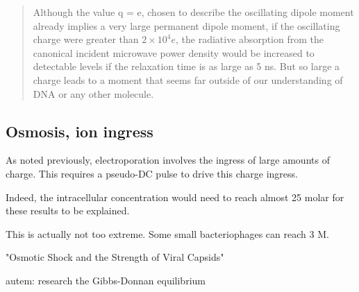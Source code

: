 \documentclass[paper.tex]{subfiles}
\begin{document}
\cite{Vibrational2002}
\begin{quote}
	Although the value q = e, chosen to describe the oscillating dipole moment already implies a very large permanent dipole moment, if the oscillating charge were greater
	than $2\times 10^4 e$, the radiative absorption from the canonical
	incident microwave power density would be increased to
	detectable levels if the relaxation time is as large as 5 ns.
	But so large a charge leads to a moment that seems far
	outside of our understanding of DNA or any other molecule.
\end{quote}


\subsection{Osmosis, ion ingress}

As noted previously, electroporation involves the ingress of large amounts of charge. This requires a pseudo-DC pulse to drive this charge ingress.



Indeed, the intracellular concentration would need to reach almost 25 molar for these results to be explained.

This is actually not too extreme. Some small bacteriophages can reach 3 M.

"Osmotic Shock and the Strength of Viral Capsids"




\begin{autem}
	autem: research the Gibbs-Donnan equilibrium
\end{autem}
\end{document}
